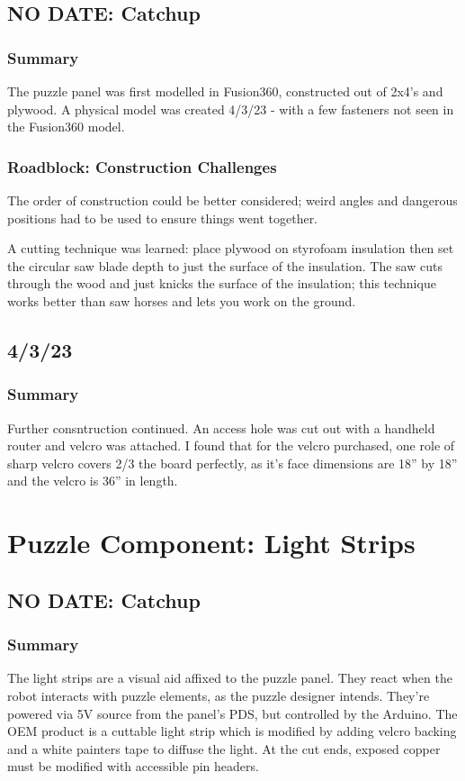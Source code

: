 \documentclass[a4paper, 10pt]{article}
\begin{document}
	\subsection{NO DATE: Catchup}
		\subsubsection{Summary}
		The puzzle panel was first modelled in Fusion360, constructed out of 2x4's and plywood. A physical model was created 4/3/23 - with a few fasteners not seen in the Fusion360 model. 
		
		\subsubsection{Roadblock: Construction Challenges}
		The order of construction could be better considered; weird angles and dangerous positions had to be used to ensure things went together. 
		
		A cutting technique was learned: place plywood on styrofoam insulation then set the circular saw blade depth to just the surface of the insulation. The saw cuts through the wood and just knicks the surface of the insulation; this technique works better than saw horses and lets you work on the ground.
		
	\subsection{4/3/23}
		\subsubsection{Summary}
		Further consntruction continued. An access hole was cut out with a handheld router and velcro was attached. I found that for the velcro purchased, one role of sharp velcro covers 2/3 the board perfectly, as it's face dimensions are 18'' by 18'' and the velcro is 36'' in length.
		
\section{Puzzle Component: Light Strips}
	\subsection{NO DATE: Catchup}
		\subsubsection{Summary}
		The light strips are a visual aid affixed to the puzzle panel. They react when the robot interacts with puzzle elements, as the puzzle designer intends. They're powered via 5V source from the panel's PDS, but controlled by the Arduino. The OEM product is a cuttable light strip which is modified by adding velcro backing and a white painters tape to diffuse the light. At the cut ends, exposed copper must be modified with accessible pin headers.
\end{document}

